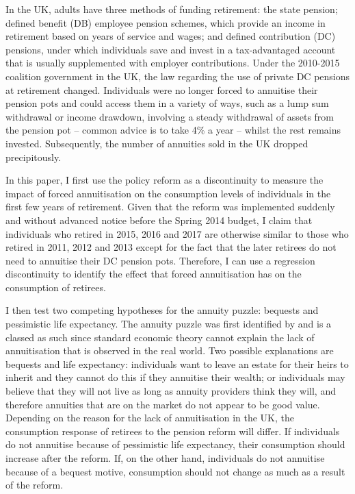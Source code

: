 \documentclass[12pt]{article}
\begin{document}
In the UK, adults have three methods of funding retirement: the state pension;
defined benefit (DB) employee pension schemes, which provide an income in
retirement based on years of service and wages; and defined
contribution (DC) pensions, under which individuals save and invest in a
tax-advantaged account that is usually supplemented with employer contributions.
Under the 2010-2015 coalition government in the UK, the law regarding the use of
private DC pensions at retirement changed. Individuals were no longer forced to
annuitise their pension pots and could access them in a variety of ways, such as
a lump sum withdrawal or income drawdown, involving a steady withdrawal of
assets from the pension pot -- common advice is to take 4\% a year -- whilst the
rest remains invested. Subsequently, the number of annuities sold in the UK
dropped precipitously.

In this paper, I first use the policy reform as a discontinuity to measure the
impact of forced annuitisation on the consumption levels of individuals in the
first few years of retirement. Given that the reform was implemented suddenly
and without advanced notice before the Spring 2014 budget, I claim that
individuals who retired in 2015, 2016 and 2017 are otherwise similar to those
who retired in 2011, 2012 and 2013 except for the fact that the later retirees
do not need to annuitise their DC pension pots. Therefore, I can use a
regression discontinuity to identify the effect that forced annuitisation has on
the consumption of retirees.

I then test two competing hypotheses for the annuity puzzle: bequests and
pessimistic life expectancy. The annuity puzzle was first identified by
\cite{yaari_65} and is a classed as such since standard economic theory cannot
explain the lack of annuitisation that is observed in the real world. Two
possible explanations are bequests and life expectancy: individuals want to
leave an estate for their heirs to inherit and they cannot do this if they
annuitise their wealth; or individuals may believe that they will not live as
long as annuity providers think they will, and therefore annuities that are on
the market do not appear to be good value. Depending on the reason for the lack
of annuitisation in the UK, the consumption response of retirees to the pension
reform will differ. If individuals do not annuitise because of pessimistic life
expectancy, their consumption should increase after the reform. If, on the other
hand, individuals do not annuitise because of a bequest motive, consumption
should not change as much as a result of the reform.
\end{document}
